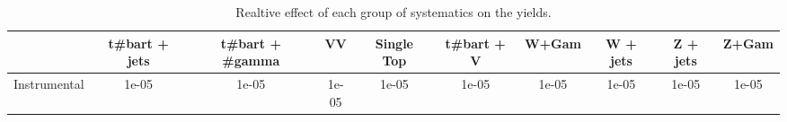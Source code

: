 \begin{table}[htbp]
\begin{center}
\begin{tabular}{|c|c|c|c|c|c|c|c|c|c|}
\hline 
      & t#bar{t} + jets      & t#bar{t} +  #gamma      & VV      & Single Top      & t#bar{t} + V      & W+Gam      & W + jets      & Z + jets      & Z+Gam \\ 
\hline 
 Instrumental & 1e-05 & 1e-05 & 1e-05 & 1e-05 & 1e-05 & 1e-05 & 1e-05 & 1e-05 & 1e-05 \\ 
\hline 
\end{tabular} 
\caption{Realtive effect of each group of systematics on the yields.} 
\end{center} 
\end{table} 
